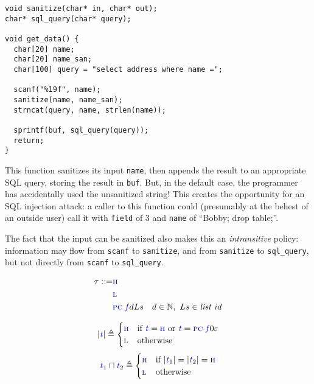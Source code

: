 \documentclass{llncs}
\begin{document}
\begin{table}[t]
\begin{verbatim}
void sanitize(char* in, char* out);
char* sql_query(char* query);

void get_data() {
  char[20] name;
  char[20] name_san;
  char[100] query = "select address where name =";

  scanf("%19f", name);
  sanitize(name, name_san);
  strncat(query, name, strlen(name));
  
  sprintf(buf, sql_query(query));
  return;
}
\end{verbatim}

This function sanitizes its input {\tt name}, then appends the result to an appropriate SQL
query, storing the result in {\tt buf}. But, in the default case, the programmer has accidentally
used the unsanitized string! This creates the opportunity for an SQL injection attack: a caller
to this function could (presumably at the behest of an outside user) call it with {\tt field} of
3 and {\tt name} of ``Bobby; drop table;''.

The fact that the input can be sanitized also makes this an {\em intransitive} policy:
information may flow from {\tt scanf} to {\tt sanitize}, and from {\tt sanitize} to
{\tt sql\_query}, but not directly from {\tt scanf} to {\tt sql\_query}.

\begin{figure}

  \begin{minipage}{0.3\textwidth}
    \color{blue}
    \begin{align*}
      \tau ::= & \textnormal{\color{blue} \sc h} \\
      & \textnormal{\color{blue} \sc l} \\
      & \textnormal{\sc \color{blue} pc} \mathit{\color{blue} ~ f}{d}{Ls} & d \in \mathbb{N}, ~ Ls \in \mathit{list} ~ id \\
    \end{align*}
  \end{minipage}
  \begin{minipage}{0.69\textwidth}
    \[|\mathit{\color{blue} t}| \triangleq
    \begin{cases}
      \textnormal{\color{blue} \sc h} & \textnormal{if } \mathit{\color{blue} t} = \textnormal{\color{blue} \sc h} \textnormal{ or } \mathit{\color{blue} t} = \textnormal{\sc \color{blue} pc} \mathit{\color{blue} ~ f}{0}{\varepsilon} \\
      \textnormal{\color{blue} \sc l} & \textnormal{otherwise} \\
    \end{cases}\]
    \[\mathit{\color{blue} t}_1 \sqcap \mathit{\color{blue} t}_2 \triangleq
    \begin{cases}
      \textnormal{\color{blue} \sc h} & \textnormal{if } |\mathit{\color{blue} t}_1| = |\mathit{\color{blue} t}_2| = \textnormal{\color{blue} \sc h} \\
      \textnormal{\color{blue} \sc l} & \textnormal{otherwise} \\
    \end{cases}\]
  \end{minipage}


\end{figure}
\end{table}
\end{document}
